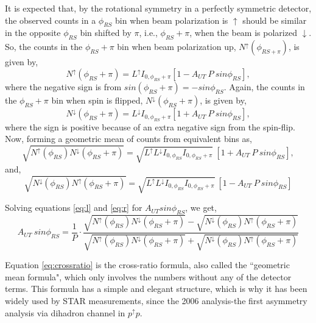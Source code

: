 It is expected that, by the rotational symmetry in a perfectly symmetric detector, the observed counts in a $\phi_{RS}$ bin when beam polarization is $\uparrow$ should be similar in the opposite $\phi_{RS}$ bin shifted by $\pi$, i.e., $\phi_{RS}+\pi$, when the beam is polarized $\downarrow$. So, the counts in the $\phi_{RS}+\pi$ bin when beam polarization up, $N^\uparrow(\phi_{RS+\pi})$, is given by, 
\begin{equation}
    N^\uparrow(\phi_{RS} +\pi)= L^\uparrow I_{0,\phi_{RS}+\pi}[1-A_{UT}\ P\ sin\phi_{RS}],
\end{equation}
where the negative sign is from $sin(\phi_{RS}+\pi) = - sin \phi_{RS}$. Again, the counts in the $\phi_{RS}+\pi$ bin when spin is flipped, $N^{\downarrow}(\phi_{RS}+\pi)$, is given by, 
\begin{equation}
    N^\downarrow(\phi_{RS} +\pi)= L^\downarrow I_{0,\phi_{RS}+\pi}[1+A_{UT}\ P\ sin\phi_{RS}],
\end{equation}
where the sign is positive because of an extra negative sign from the spin-flip. Now, forming a geometric mean of counts from equivalent bins as, 
\begin{equation}
\label{eq:l}
    \sqrt{N^\uparrow(\phi_{RS}) N^\downarrow(\phi_{RS}+\pi)} = \sqrt{L^\uparrow L^\downarrow I_{0,\phi_{RS}} I_{0,\phi_{RS}+\pi}}\ [1+A_{UT}\ P\ sin\phi_{RS}],
\end{equation}
and, 
\begin{equation}
\label{eq:r}
    \sqrt{N^\downarrow(\phi_{RS}) N^\uparrow(\phi_{RS}+\pi)} = \sqrt{L^\uparrow L^\downarrow I_{0,\phi_{RS}} I_{0,\phi_{RS}+\pi}}\ [1-A_{UT}\ P\ sin\phi_{RS}]
\end{equation}

Solving equations \ref{eq:l} and \ref{eq:r} for $A_{UT}sin\phi_{RS}$, we get, 
\begin{equation}
\label{eq:crossratio}
    A_{UT}\ sin\phi_{RS} = \frac{1}{P}\cdot \frac{\sqrt{N^\uparrow(\phi_{RS})N^\downarrow(\phi_{RS}+\pi)} -\sqrt{N^\downarrow(\phi_{RS})N^\uparrow(\phi_{RS}+\pi)}}{\sqrt{N^\uparrow(\phi_{RS})N^\downarrow(\phi_{RS}+\pi)} +\sqrt{N^\downarrow(\phi_{RS})N^\uparrow(\phi_{RS}+\pi)}}
\end{equation}

Equation \ref{eq:crossratio} is the cross-ratio formula, also called the ``geometric mean formula", which only involves the numbers without any  of the detector terms. This formula has a simple and elegant structure, which is why it has been widely used by STAR measurements, since the 2006 analysis-the first asymmetry analysis via dihadron channel in $p^\uparrow p$.

